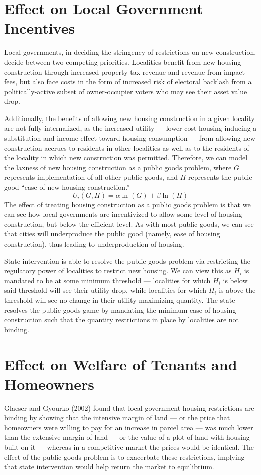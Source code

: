 \documentclass[12pt]{extarticle}
\newlength\tindent
\renewcommand{\indent}{\hspace*{\tindent}}
\begin{document}
  \section*{Effect on Local Government Incentives}%
  \indent Local governments, in deciding the stringency of restrictions on new construction, decide between two competing priorities. Localities benefit from new housing construction through increased property tax revenue and revenue from impact fees,\supercite{impact_fees} but also face costs in the form of increased risk of electoral backlash from a politically-active subset of owner-occupier voters who may see their asset value drop.\supercite{owner_nimbys}

  \indent Additionally, the benefits of allowing new housing construction in a given locality are not fully internalized, as the increased utility --- lower-cost housing inducing a substitution and income effect toward housing consumption --- from allowing new construction accrues to residents in other localities as well as to the residents of the locality in which new construction was permitted. Therefore, we can model the laxness of new housing construction as a public goods problem, where $G$ represents implementation of all other public goods, and $H$ represents the public good ``ease of new housing construction.''
  \[U_i(G,H) = \alpha \ln(G) + \beta \ln(H)\]
  \indent The effect of treating housing construction as a public goods problem is that we can see how local governments are incentivized to allow some level of housing construction, but below the efficient level. As with most public goods, we can see that cities will underproduce the public good (namely, ease of housing construction), thus leading to underproduction of housing.

  \indent State intervention is able to resolve the public goods problem via restricting the regulatory power of localities to restrict new housing. We can view this as $H_i$ is mandated to be at some minimum threshold --- localities for which $H_i$ is below said threshold will see their utility drop, while localities for which $H_i$ is above the threshold will see no change in their utility-maximizing quantity. The state resolves the public goods game by mandating the minimum ease of housing construction such that the quantity restrictions in place by localities are not binding.
  \section*{Effect on Welfare of Tenants and Homeowners}%
  \indent Glaeser and Gyourko (2002) found that local government housing restrictions are binding by showing that the intensive margin of land --- or the price that homeowners were willing to pay for an increase in parcel area --- was much lower than the extensive margin of land --- or the value of a plot of land with housing built on it --- whereas in a competitive market the prices would be identical.\supercite{glaeser_gyourko_2002} The effect of the public goods problem is to exacerbate these restrictions, implying that state intervention would help return the market to equilibrium.
\end{document}
